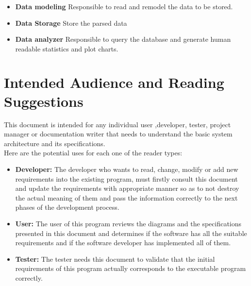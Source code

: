 \documentclass{scrreprt}
\begin{document}
\begin{itemize}
  \item \textbf{Data modeling} \- Responsible to read and remodel the data to be stored.
  \item \textbf{Data Storage} \- Store the parsed data
  \item \textbf{Data analyzer} \- Responsible to query the database and generate
    human readable statistics and plot charts.
\end{itemize}




 \section{Intended Audience and Reading Suggestions}
This document is intended for any individual user ,developer, tester, project manager or
documentation writer that needs to understand the basic system architecture and its specifications.\\
Here are the potential uses for each one of the reader types:\\
\begin{itemize}

\item \textbf{Developer: }The developer who wants to read, change, modify or add new requirements into
the existing program, must firstly consult this document and update the requirements with
appropriate manner so as to not destroy the actual meaning of them and pass the information
correctly to the next phases of the development process.\\

\item \textbf{User: }The user of this program reviews the diagrams and the specifications presented in this
document and determines if the software has all the suitable requirements and if the software
developer has implemented all of them.\\

\item \textbf{Tester: }The tester needs this document to validate that the initial requirements of this
program actually corresponds to the executable program correctly.\\

\end{itemize}
\end{document}
